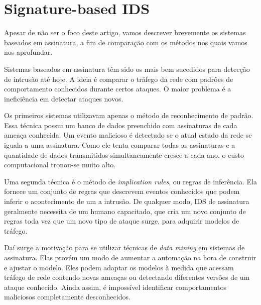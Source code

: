 \chapter{Signature-based IDS}
\label{snids}
Apesar de não ser o foco deste artigo, vamos descrever brevemente os sistemas baseados em assinatura, a fim de
comparação com os métodos nos quais vamos nos aprofundar.
\par Sistemas baseados em assinatura têm sido os mais bem sucedidos para detecção de intrusão até hoje.
A ideia é comparar o tráfego da rede com padrões de comportamento conhecidos durante certos ataques.
O maior problema é a ineficiência em detectar ataques novos.
\par Os primeiros sistemas utilizavam apenas o método de reconhecimento de padrão. Essa técnica possui um banco de dados
 preenchido com assinaturas de cada ameaça conhecida. Um evento malicioso é detectado se o atual estado da rede se iguala
 a uma assinatura. Como ele tenta comparar todas as assinaturas e a quantidade de dados transmitidos simultaneamente
cresce a cada ano, o custo computacional tronou-se muito alto.
\par Uma segunda técnica é o método de \textit{implication rules}, ou regras de inferência. Ela fornece um conjunto de
regras que descrevem eventos conhecidos que podem inferir o acontecimento de um a intrusão. De qualquer modo, IDS de
assinatura geralmente necessita de um humano capacitado, que cria um novo conjunto de regras toda vez que um novo
tipo de ataque surge, para adquirir modelos de tráfego.
\par Daí surge a motivação para se utilizar técnicas de \textit{data mining} em sistemas de assinatura. Elas provém um
 modo de aumentar a automação na hora de construir e ajustar o modelo. Eles podem adaptar os modelos à medida que
 acessam tráfego de rede contendo novas ameaças ou detectando diferentes versões de um ataque conhecido. Ainda assim,
 é impossível identificar comportamentos maliciosos completamente desconhecidos.